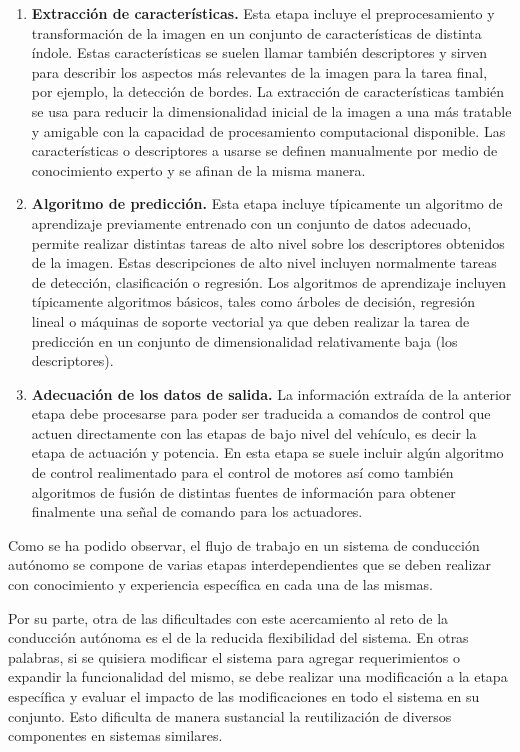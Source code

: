 \documentclass[12pt,letterpaper]{article}
\begin{document}
\begin{enumerate}
    \item \textbf{Extracción de características.} Esta etapa incluye el preprocesamiento y transformación de la imagen 
    en un conjunto de características de distinta índole. Estas características se suelen llamar también descriptores 
    y sirven para describir los aspectos más relevantes de la imagen para la tarea final, por ejemplo, la detección de bordes. 
    La extracción de características también se usa para reducir la dimensionalidad inicial de la imagen a una más tratable y 
    amigable con la capacidad de procesamiento computacional disponible. Las características o descriptores a usarse 
    se definen manualmente por medio de conocimiento experto y se afinan de la misma manera.

    \item \textbf{Algoritmo de predicción.} Esta etapa incluye típicamente un algoritmo de aprendizaje previamente 
    entrenado con un conjunto de datos adecuado, permite realizar distintas tareas de alto nivel sobre los descriptores 
    obtenidos de la imagen. Estas descripciones de alto nivel incluyen normalmente tareas de detección, 
    clasificación o regresión. Los algoritmos de aprendizaje incluyen típicamente algoritmos básicos, tales como árboles de decisión,
    regresión lineal o máquinas de soporte vectorial ya que deben realizar la tarea de predicción en un 
    conjunto de dimensionalidad relativamente baja (los descriptores).

    \item \textbf{Adecuación de los datos de salida.} La información extraída de la anterior etapa debe 
    procesarse para poder ser traducida a comandos de control que actuen directamente con las etapas 
    de bajo nivel del vehículo, es decir la etapa de actuación y potencia. En esta etapa se suele incluir algún algoritmo 
    de control realimentado para el control de motores así como también algoritmos de fusión de distintas fuentes de información
    para obtener finalmente una señal de comando para los actuadores.
\end{enumerate}

Como se ha podido observar, el flujo de trabajo en un sistema de conducción autónomo se compone de varias etapas 
interdependientes que se deben realizar con conocimiento y experiencia específica en cada una de las mismas. 

Por su parte, otra de las dificultades con este acercamiento al reto de la conducción autónoma es el de la reducida
flexibilidad del sistema. En otras palabras, si se quisiera modificar el sistema para agregar requerimientos o 
expandir la funcionalidad del mismo, se debe realizar una modificación a la etapa específica y evaluar el impacto de 
las modificaciones en todo el sistema en su conjunto. Esto dificulta de manera sustancial la reutilización de diversos
componentes en sistemas similares.
\end{document}

